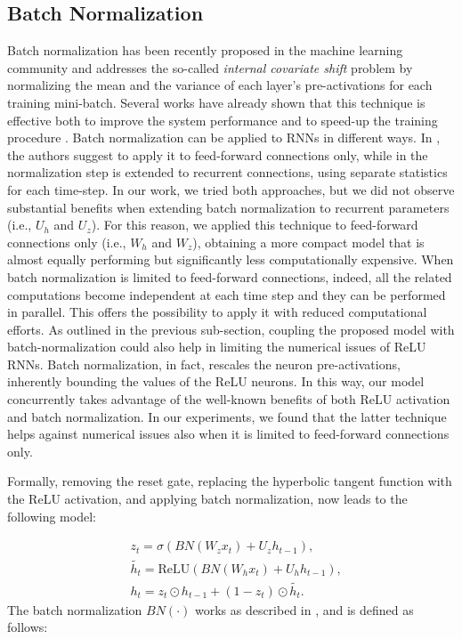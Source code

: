 \documentclass[journal]{IEEEtran}
\begin{document}
\subsection{Batch Normalization} \label{sec:bn}
Batch normalization \cite{batchnorm} has been recently proposed in the machine learning community and addresses the so-called \textit{internal covariate shift} problem by normalizing the mean and the variance of each layer's pre-activations for each training mini-batch. Several works have already shown that this technique is effective both to improve the system performance and to speed-up the training procedure \cite{cesar,tim,baidu,ravanelli_SLT,ravanelli_icassp}. Batch normalization can be applied to RNNs in different ways. In \cite{cesar}, the authors suggest to apply it to feed-forward connections only, while in \cite{tim} the normalization step is extended to recurrent connections, using separate statistics for each time-step.  In our work, we tried both approaches, but  we did not observe substantial benefits when extending batch normalization to recurrent parameters (i.e., $U_{h}$ and $U_{z}$).  For this reason, we applied this technique to feed-forward connections only (i.e., $W_{h}$ and $W_{z}$), obtaining a more compact model that is almost equally performing but significantly less computationally expensive. When batch normalization is limited to feed-forward connections, indeed, all the related computations become independent at each time step and they can be performed in parallel. This offers the possibility to apply it with reduced computational efforts.  As outlined in the previous sub-section, coupling the proposed model with batch-normalization \cite{batchnorm} could also help in limiting the numerical issues of ReLU RNNs. Batch normalization, in fact, rescales the neuron pre-activations, inherently bounding the values of the ReLU neurons. 
In this way, our model concurrently takes advantage of the well-known benefits of both ReLU activation and batch normalization.
In our experiments, we found that the latter technique helps against numerical issues also when it is limited to feed-forward connections only.

Formally, removing the reset gate, replacing the hyperbolic tangent function with the ReLU activation, and applying batch normalization, now leads to the following model:

\begin{subequations}
\begin{align}
\label{eq:eq_5a}&z_{t}=\sigma(BN(W_{z}x_{t})+U_{z}h_{t-1}), \\
\label{eq:eq_5b}&\widetilde{h_{t}}=\mbox{ReLU}(BN(W_{h}x_{t})+U_{h}h_{t-1}), \\
\label{eq:eq_5c}&h_{t}=z_{t} \odot h_{t-1}+ (1-z_{t}) \odot \widetilde{h_{t}}.
\end{align}
\end{subequations}
The batch normalization $BN(\cdot)$ works as described in \cite{batchnorm}, and is defined as follows:
\end{document}
